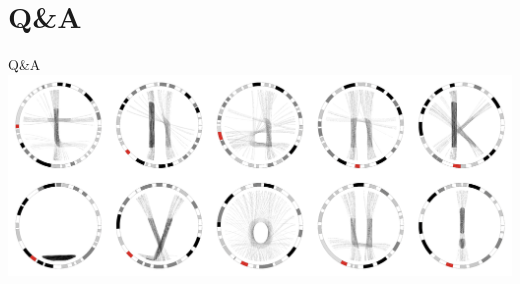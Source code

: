 \documentclass[12pt]{phage3slides} %
\begin{document}
{%
  \begin{frame}[plain]
  \end{frame}
}

\section{Q\&A}
\begin{frame}{Q\&A}
	\includegraphics[width=\textwidth]{thankyou.png}
	\begin{center}
		\informationErascheTable
		\begin{tabular}{rl}
			\end{tabular}\\[1cm]
			\fundingNSFABIannotation
	\end{center}
\end{frame}
\end{document}
